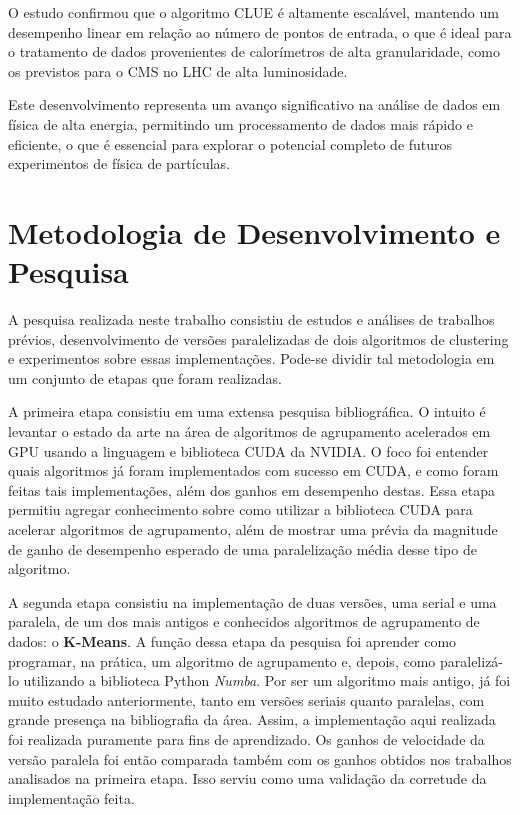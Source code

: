 \documentclass[12pt, %
openright, 
oneside, %
a4paper,    %
brazil]{facom-ufu-abntex2}
\def\qntAlgrtm{dois}
\begin{document}
O estudo confirmou que o algoritmo CLUE é altamente escalável, mantendo um desempenho linear em relação ao número de pontos de entrada, o que é ideal para o tratamento de dados provenientes de calorímetros de alta granularidade, como os previstos para o CMS no LHC de alta luminosidade.

Este desenvolvimento representa um avanço significativo na análise de dados em física de alta energia, permitindo um processamento de dados mais rápido e eficiente, o que é essencial para explorar o potencial completo de futuros experimentos de física de partículas.





\chapter{Metodologia de Desenvolvimento e Pesquisa}


A pesquisa realizada neste trabalho consistiu de estudos e análises de trabalhos prévios, desenvolvimento de versões paralelizadas de \qntAlgrtm{} algoritmos de clustering e experimentos sobre essas implementações. Pode-se dividir tal metodologia em um conjunto de etapas que foram realizadas.

A primeira etapa consistiu em uma extensa pesquisa bibliográfica. O intuito é levantar o estado da arte na área de algoritmos de agrupamento acelerados em GPU usando a linguagem e biblioteca CUDA da NVIDIA. O foco foi entender quais algoritmos já foram implementados com sucesso em CUDA, e como foram feitas tais implementações, além dos ganhos em desempenho destas. Essa etapa permitiu agregar conhecimento sobre como utilizar a biblioteca CUDA para acelerar algoritmos de agrupamento, além de mostrar uma prévia da magnitude de ganho de desempenho esperado de uma paralelização média desse tipo de algoritmo.

A segunda etapa consistiu na implementação de duas versões, uma serial e uma paralela, de um dos mais antigos e conhecidos algoritmos de agrupamento de dados: o \textbf{K-Means}. A função dessa etapa da pesquisa foi aprender como programar, na prática, um algoritmo de agrupamento e, depois, como paralelizá-lo utilizando a biblioteca Python \textit{Numba}. Por ser um algoritmo mais antigo, já foi muito estudado anteriormente, tanto em versões seriais quanto paralelas, com grande presença na bibliografia da área. Assim, a implementação aqui realizada foi realizada puramente para fins de aprendizado. Os ganhos de velocidade da versão paralela foi então comparada também com os ganhos obtidos nos trabalhos analisados na primeira etapa. Isso serviu como uma validação da corretude da implementação feita.
\end{document}
